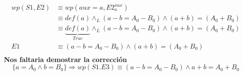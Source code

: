 \begin{align*}
wp (S1, E2)  &\equiv wp ( aux= a, E2_{a}^{aux})   \\
&\equiv def (a)  \wedge_L (a-b = A_0 - B_0) \wedge (a + b ) = (A_0 + B_0 ) \\
&\equiv \underbrace{ def (a)}_{True}  \wedge_L (a-b = A_0 - B_0) \wedge (a + b ) = (A_0 + B_0 ) \\
E1 &\equiv (a-b = A_0 - B_0) \wedge (a + b ) = (A_0 + B_0 )\\
\end{align*}
\textbf{Nos faltaria demostrar la correcci\'on} \\
\begin{equation}
\{ a=A_0 \wedge b=B_0 \} \Rightarrow wp(S1.E3) \equiv  (a-b=A_0-B_0) \wedge a+b = A_0+B_0
\end{equation}